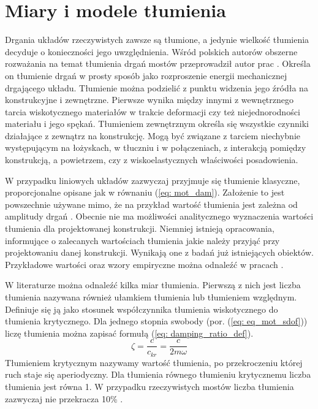 \section{Miary i modele tłumienia}
Drgania układów rzeczywistych zawsze są tłumione, a jedynie wielkość tłumienia decyduje o konieczności jego uwzględnienia. Wśród polskich autorów obszerne rozważania na temat tłumienia drgań mostów przeprowadził autor prac \cite{Salamak2003,Salamak2007}. Określa on tłumienie drgań w prosty sposób jako rozproszenie energii mechanicznej drgającego układu. Tłumienie można podzielić z punktu widzenia jego źródła na konstrukcyjne i zewnętrzne. Pierwsze wynika między innymi z wewnętrznego tarcia wiskotycznego materiałów w trakcie deformacji czy też niejednorodności materiału i jego spękań. Tłumieniem zewnętrznym określa się wszystkie czynniki działające z zewnątrz na konstrukcję. Mogą być związane z tarciem niechybnie występującym na łożyskach, w tłuczniu i w połączeniach, z interakcją pomiędzy konstrukcją, a powietrzem, czy z wiskoelastycznych właściwości posadowienia.

W przypadku liniowych układów zazwyczaj przyjmuje się tłumienie klasyczne, proporcjonalne opisane jak w równaniu (\ref{eq: mot_dam}). Założenie to jest powszechnie używane mimo, że na przykład wartość tłumienia jest zależna od amplitudy drgań \parencite{Ladislav1996}. Obecnie nie ma możliwości analitycznego wyznaczenia wartości tłumienia dla projektowanej konstrukcji. Niemniej istnieją opracowania, informujące o zalecanych wartościach tłumienia jakie należy przyjąć przy projektowaniu danej konstrukcji. Wynikają one z badań już istniejących obiektów. Przykładowe wartości oraz wzory empiryczne można odnaleźć w pracach \parencite{Salamak2003, Fryba1999,Bachmann2012,Yamaguchi1997}. 

W literaturze można odnaleźć kilka miar tłumienia. Pierwszą z nich jest liczba tłumienia  nazywana również ułamkiem tłumienia lub tłumieniem względnym. Definiuje się ją jako stosunek współczynnika tłumienia wiskotycznego do tłumienia krytycznego. Dla jednego stopnia swobody (por. (\ref{eq: eq_mot_sdof})) liczę tłumienia można zapisać formułą (\ref{eq: damping_ratio_def}).
\begin{equation} \label{eq: damping_ratio_def}
	\zeta = \frac{c}{c_{kr}}=\frac{c}{2m\omega}
\end{equation}
Tłumieniem krytycznym nazywamy wartość tłumienia, po przekroczeniu której ruch staje się aperiodyczny. Dla tłumienia równego tłumieniu krytycznemu liczba tłumienia jest równa 1. W przypadku rzeczywistych mostów liczba tłumienia zazwyczaj nie przekracza 10\% \parencite{Salamak2003}. 

